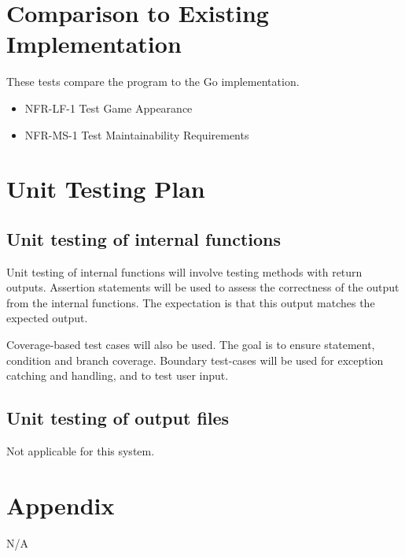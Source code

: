 \documentclass[12pt, titlepage]{article}
\begin{document}
	
\section{Comparison to Existing Implementation}
These tests compare the program to the Go implementation.
\begin{itemize}
    \item NFR-LF-1 Test Game Appearance
    \item NFR-MS-1 Test Maintainability Requirements
\end{itemize}

\section{Unit Testing Plan}
		
\subsection{Unit testing of internal functions}
Unit testing of internal functions will involve testing methods with return outputs. Assertion statements will be used to assess the correctness of the output from the internal functions. The expectation is that this output matches the expected output. 

Coverage-based test cases will also be used. The goal is to ensure statement, condition and branch coverage. Boundary test-cases will be used for exception catching and handling, and to test user input.

\subsection{Unit testing of output files}		
Not applicable for this system.





\newpage

\section{Appendix}

N/A
\end{document}
